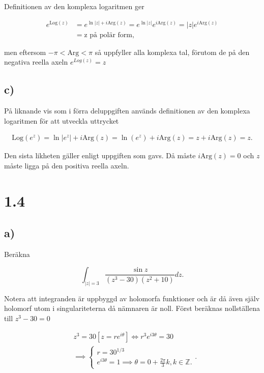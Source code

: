 \documentclass[a4paper]{article}
\begin{document}
Definitionen av den komplexa logaritmen ger

\begin{align*}
	e^{\text{Log}(z)}	&= e^{\ln|z| + i\text{Arg}(z)} = e^{\ln|z|}e^{i\text{Arg}(z)} = |z|e^{i\text{Arg}(z)}\\
						&= \text{z på polär form},
\end{align*}

men eftersom $-\pi < \text{Arg} < \pi$ så uppfyller alla komplexa tal, förutom de på den negativa reella axeln $e^{Log(z)} = z$

\subsection*{c)}

På liknande vis som i förra deluppgiften används definitionen av den komplexa logaritmen för att utveckla uttrycket

\begin{align*}
	\text{Log}(e^z) = \ln|e^z| + i\text{Arg}(z) = \ln(e^z) + i\text{Arg}(z) = z + i\text{Arg}(z) = z.
\end{align*}

Den sista likheten gäller enligt uppgiften som gavs. Då måste $i\text{Arg}(z) = 0$ och $z$ måste ligga på den positiva reella axeln.

\section*{1.4}
\subsection*{a)}

Beräkna

\begin{equation*}
	\int_{|z|=3}\frac{\sin z}{(z^3 - 30)(z^2 + 10)}dz.
\end{equation*}

Notera att integranden är uppbyggd av holomorfa funktioner och är då även själv holomorf utom i singulariteterna då nämnaren är noll. Först beräknas nollställena till $z^3 - 30 = 0$

\begin{align*}
	&z^3 = 30 \left[z = re^{i\theta}\right] \iff r^3e^{i3\theta} = 30\\
	&\implies	\begin{cases}
					r = 30^{1/3}\\
					e^{i3\theta} = 1 \implies \theta = 0 + \frac{2\pi}{3}k, k \in \mathbb{Z}.
				\end{cases}.
\end{align*}
\end{document}
